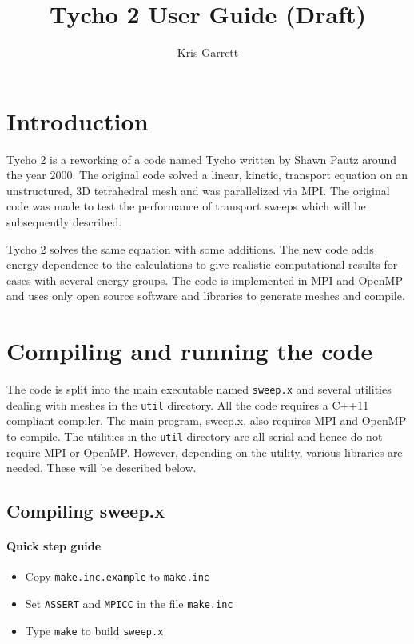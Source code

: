 \documentclass[12pt,letterpaper]{article}
\author{Kris Garrett}
\title{Tycho 2 User Guide (Draft)}
\begin{document}
\maketitle


\section{Introduction}
Tycho 2 is a reworking of a code named Tycho written by Shawn Pautz around the year 2000.
The original code solved a linear, kinetic, transport equation on an unstructured, 3D tetrahedral mesh and was parallelized via MPI.
The original code was made to test the performance of transport sweeps which will be subsequently described.

Tycho 2 solves the same equation with some additions.
The new code adds energy dependence to the calculations to give realistic computational results for cases with several energy groups.
The code is implemented in MPI and OpenMP and uses only open source software and libraries to generate meshes and compile.







\section{Compiling and running the code}
The code is split into the main executable named {\tt sweep.x} and several utilities dealing with meshes in the {\tt util} directory.
All the code requires a C++11 compliant compiler.
The main program, sweep.x, also requires MPI and OpenMP to compile.
The utilities in the {\tt util} directory are all serial and hence do not require MPI or OpenMP.
However, depending on the utility, various libraries are needed.
These will be described below.


\subsection{Compiling sweep.x}
\paragraph{Quick step guide}
\begin{itemize}
\item Copy {\tt make.inc.example} to {\tt make.inc}
\item Set {\tt ASSERT} and {\tt MPICC} in the file {\tt make.inc}
\item Type {\tt make} to build {\tt sweep.x}
\end{itemize}
\end{document}
